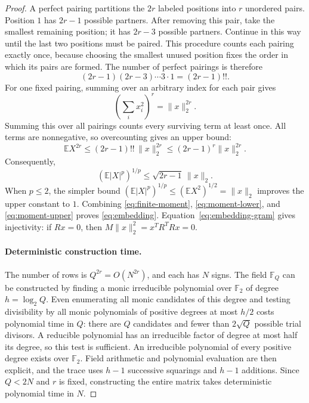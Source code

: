 \documentclass[11pt,letterpaper]{article}
\numberwithin{equation}{section}
\theoremstyle{definition}
\theoremstyle{remark}
\newcommand{\F}{\mathbb F}
\newcommand{\E}{\mathbb E}
\begin{document}
\begin{proof}
A perfect pairing partitions the $2r$ labeled positions into $r$ unordered pairs. Position $1$ has $2r-1$ possible partners. After removing this pair, take the smallest remaining position; it has $2r-3$ possible partners. Continue in this way until the last two positions must be paired. This procedure counts each pairing exactly once, because choosing the smallest unused position fixes the order in which its pairs are formed. The number of perfect pairings is therefore
\[
 (2r-1)(2r-3)\cdots3\cdot1=(2r-1)!!.
\]
For one fixed pairing, summing over an arbitrary index for each pair gives
\[
 \left(\sum_i x_i^2\right)^r=\|x\|_2^{2r}.
\]
Summing this over all pairings counts every surviving term at least once. All terms are nonnegative, so overcounting gives an upper bound:
\[
 \E X^{2r}\le(2r-1)!!\,\|x\|_2^{2r}
 \le(2r-1)^r\|x\|_2^{2r}.
\]
Consequently,
\begin{equation}\label{eq:moment-upper}
 (\E|X|^p)^{1/p}\le\sqrt{2r-1}\,\|x\|_2.
\end{equation}
When $p\le2$, the simpler bound $(\E|X|^p)^{1/p}\le(\E X^2)^{1/2}=\|x\|_2$ improves the upper constant to $1$. Combining \eqref{eq:finite-moment}, \eqref{eq:moment-lower}, and \eqref{eq:moment-upper} proves \eqref{eq:embedding}. Equation~\eqref{eq:embedding-gram} gives injectivity: if $Rx=0$, then $M\|x\|_2^2=x^TR^TRx=0$.

\paragraph{Deterministic construction time.}
The number of rows is $Q^{2r}=O(N^{2r})$, and each has $N$ signs. The field $\F_Q$ can be constructed by finding a monic irreducible polynomial over $\F_2$ of degree $h=\log_2Q$. Even enumerating all monic candidates of this degree and testing divisibility by all monic polynomials of positive degrees at most $h/2$ costs polynomial time in $Q$: there are $Q$ candidates and fewer than $2\sqrt Q$ possible trial divisors. A reducible polynomial has an irreducible factor of degree at most half its degree, so this test is sufficient. An irreducible polynomial of every positive degree exists over $\F_2$. Field arithmetic and polynomial evaluation are then explicit, and the trace uses $h-1$ successive squarings and $h-1$ additions. Since $Q<2N$ and $r$ is fixed, constructing the entire matrix takes deterministic polynomial time in $N$.
\end{proof}
\end{document}
